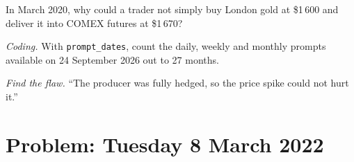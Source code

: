 \begin{exercise}[$\star\star$]\label{exo:m3:metals:6}
In March 2020, why could a trader not simply buy London gold at \$1\,600 and deliver it into
COMEX futures at \$1\,670?
\end{exercise}

\begin{exercise}[$\star\star\star$]\label{exo:m3:metals:7}
\emph{Coding.} With \texttt{prompt\_dates}, count the daily, weekly and monthly prompts available on
24 September 2026 out to 27 months.
\end{exercise}

\begin{exercise}[$\star\star\star$]\label{exo:m3:metals:8}
\emph{Find the flaw.} ``The producer was fully hedged, so the price spike could not hurt it.''
\end{exercise}

\section{Problem: Tuesday 8 March 2022}

